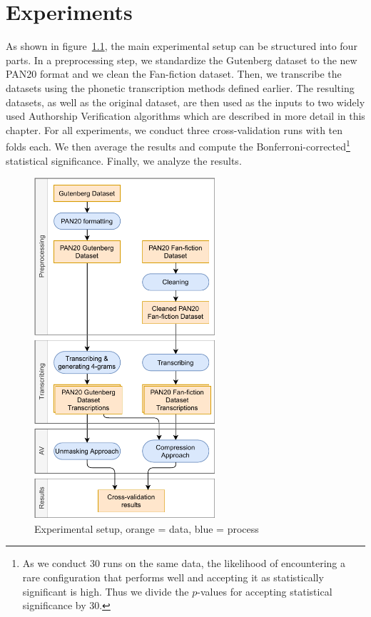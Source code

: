 \chapter{Experiments}\label{experiments}
As shown in figure~\ref{fig:process}, the main experimental setup can be structured into four parts.
In a preprocessing step, we standardize the Gutenberg dataset to the new PAN20 format and we clean the Fan-fiction dataset.
Then, we transcribe the datasets using the phonetic transcription methods defined earlier.
The resulting datasets, as well as the original dataset, are then used as the inputs to two widely used Authorship Verification algorithms which are described in more detail in this chapter.
For all experiments, we conduct three cross-validation runs with ten folds each.
We then average the results and compute the Bonferroni-corrected\footnote{As we conduct 30 runs on the same data, the likelihood of encountering a rare configuration that performs well and accepting it as statistically significant is high. Thus we divide the $p$-values for accepting statistical significance by 30.} statistical significance.
Finally, we analyze the results.

\begin{figure}
  \centering
  \includegraphics[width=0.6\textwidth]{figures/process}
  \caption{Experimental setup, orange = data, blue = process}
  \label{fig:process}
\end{figure}

